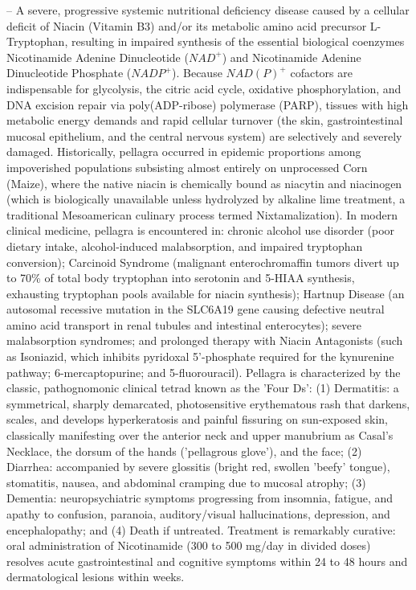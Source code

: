 -- A severe, progressive systemic nutritional deficiency disease caused by a cellular deficit of Niacin (Vitamin B3) and/or its metabolic amino acid precursor L-Tryptophan, resulting in impaired synthesis of the essential biological coenzymes Nicotinamide Adenine Dinucleotide ($NAD^+$) and Nicotinamide Adenine Dinucleotide Phosphate ($NADP^+$). Because $NAD(P)^+$ cofactors are indispensable for glycolysis, the citric acid cycle, oxidative phosphorylation, and DNA excision repair via poly(ADP-ribose) polymerase (PARP), tissues with high metabolic energy demands and rapid cellular turnover (the skin, gastrointestinal mucosal epithelium, and the central nervous system) are selectively and severely damaged. Historically, pellagra occurred in epidemic proportions among impoverished populations subsisting almost entirely on unprocessed Corn (Maize), where the native niacin is chemically bound as niacytin and niacinogen (which is biologically unavailable unless hydrolyzed by alkaline lime treatment, a traditional Mesoamerican culinary process termed Nixtamalization). In modern clinical medicine, pellagra is encountered in: chronic alcohol use disorder (poor dietary intake, alcohol-induced malabsorption, and impaired tryptophan conversion); Carcinoid Syndrome (malignant enterochromaffin tumors divert up to 70\% of total body tryptophan into serotonin and 5-HIAA synthesis, exhausting tryptophan pools available for niacin synthesis); Hartnup Disease (an autosomal recessive mutation in the SLC6A19 gene causing defective neutral amino acid transport in renal tubules and intestinal enterocytes); severe malabsorption syndromes; and prolonged therapy with Niacin Antagonists (such as Isoniazid, which inhibits pyridoxal 5'-phosphate required for the kynurenine pathway; 6-mercaptopurine; and 5-fluorouracil). Pellagra is characterized by the classic, pathognomonic clinical tetrad known as the 'Four Ds': (1) Dermatitis: a symmetrical, sharply demarcated, photosensitive erythematous rash that darkens, scales, and develops hyperkeratosis and painful fissuring on sun-exposed skin, classically manifesting over the anterior neck and upper manubrium as Casal's Necklace, the dorsum of the hands ('pellagrous glove'), and the face; (2) Diarrhea: accompanied by severe glossitis (bright red, swollen 'beefy' tongue), stomatitis, nausea, and abdominal cramping due to mucosal atrophy; (3) Dementia: neuropsychiatric symptoms progressing from insomnia, fatigue, and apathy to confusion, paranoia, auditory/visual hallucinations, depression, and encephalopathy; and (4) Death if untreated. Treatment is remarkably curative: oral administration of Nicotinamide (300 to 500 mg/day in divided doses) resolves acute gastrointestinal and cognitive symptoms within 24 to 48 hours and dermatological lesions within weeks.

